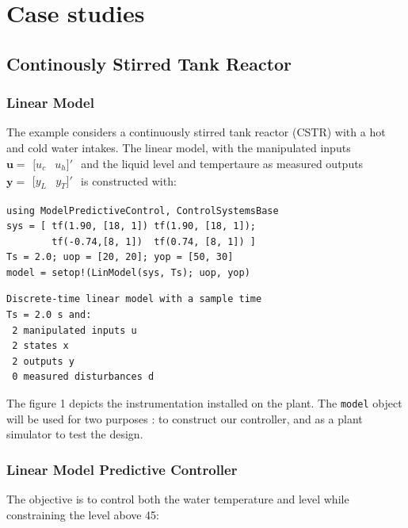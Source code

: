\section{Case studies}

\subsection{Continously Stirred Tank Reactor}

\subsubsection{Linear Model}

The example considers a continuously stirred tank reactor (CSTR) with a hot and cold water intakes. The linear model, with the manipulated inputs $\mathbf{u}=\begin{smallmatrix}[
u_c & u_h]'\end{smallmatrix}$ and the liquid level and tempertaure as measured outputs $\mathbf{y}=\begin{smallmatrix}[y_L & y_T]'\end{smallmatrix}$ is constructed with:

\begin{verbatim}
using ModelPredictiveControl, ControlSystemsBase
sys = [ tf(1.90, [18, 1]) tf(1.90, [18, 1]);
        tf(-0.74,[8, 1])  tf(0.74, [8, 1]) ]
Ts = 2.0; uop = [20, 20]; yop = [50, 30]
model = setop!(LinModel(sys, Ts); uop, yop)
\end{verbatim}
\vspace{-26pt}
\begin{verbatim}
Discrete-time linear model with a sample time 
Ts = 2.0 s and:
 2 manipulated inputs u
 2 states x
 2 outputs y
 0 measured disturbances d
\end{verbatim}

The figure 1 depicts the instrumentation installed on the plant. The \texttt{model} object will be used for two purposes : to construct our controller, and as a plant simulator to test the design.

\subsubsection{Linear Model Predictive Controller}

The objective is to control both the water temperature and level while constraining the level above 45:

